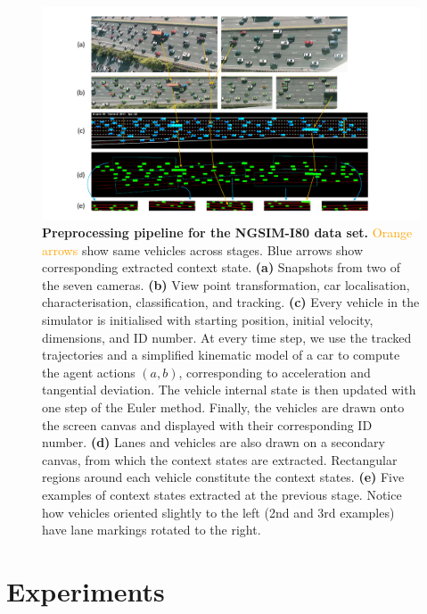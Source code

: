 \documentclass{article}
\begin{document}
\begin{figure}
  \centering
  \includegraphics[width=\textwidth]{images/I-80}
  \caption{
    \textbf{Preprocessing pipeline for the NGSIM-I80 data set.}
    \textcolor{Orange}{Orange arrows} show same vehicles across stages.
    \textcolor{ProcessBlue}{Blue arrows} show corresponding extracted context state.
    \textbf{(a)} Snapshots from two of the seven cameras.
    \textbf{(b)} View point transformation, car localisation, characterisation, classification, and tracking.
    \textbf{(c)} Every vehicle in the simulator is initialised with starting position, initial velocity, dimensions, and ID number.
    At every time step, we use the tracked trajectories and a simplified kinematic model of a car to compute the agent actions $(a, b)$, corresponding to acceleration and tangential deviation.
    The vehicle internal state is then updated with one step of the Euler method.
    Finally, the vehicles are drawn onto the screen canvas and displayed with their corresponding ID number.
    \textbf{(d)} Lanes and vehicles are also drawn on a secondary canvas, from which the context states are extracted.
    Rectangular regions around each vehicle constitute the context states.
    \textbf{(e)} Five examples of context states extracted at the previous stage.
    Notice how vehicles oriented slightly to the left (2nd and 3rd examples) have lane markings rotated to the right.
  }
\end{figure}

\section{Experiments}
\end{document}
